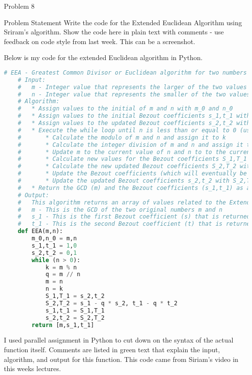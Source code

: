 \begin{problem}{Problem 8}
    \begin{statement}{Problem Statement}
        Write the code for the Extended Euclidean Algorithm using Sriram’s algorithm. Show the code here in plain text with comments - use feedback on code style from last week. This can be a screenshot.
    \end{statement}

    \begin{Highlight}[Solution]
        Below is my code for the extended Euclidean algorithm in Python.
    \begin{lstlisting}[style=stackoverflow, language=python]
    # EEA - Greatest Common Divisor or Euclidean algorithm for two numbers m and n
    # Input:
    #   m - Integer value that represents the larger of the two values in the EEA calculation
    #   n - Integer value that represents the smaller of the two values in the EEA calculation
    # Algorithm:
    #   * Assign values to the initial of m and n with m_0 and n_0
    #   * Assign values to the initial Bezout coefficients s_1,t_1 with 1 and 0
    #   * Assign values to the updated Bezout coefficients s_2,t_2 with 0 and 1
    #   * Execute the while loop until n is less than or equal to 0 (usually equal to 0)
    #       * Calculate the modulo of m and n and assign it to k
    #       * Calculate the integer division of m and n and assign it to q
    #       * Update m to the current value of n and n to to the current value of k
    #       * Calculate new values for the Bezout coefficients S_1,T_1 with s_2,t_2
    #       * Calculate the new updated Bezout coefficients S_2,T_2 with s_1 - q * s_2, t_1 - q * t_2
    #       * Update the Bezout coefficients (which will eventually be returned) s_1,t_1 with S_1,T_1
    #       * Update the updated Bezout coefficients s_2,t_2 with S_2,T_2
    #   * Return the GCD (m) and the Bezout coefficients (s_1,t_1) as an array after the loop
    # Output:
    #   This algorithm returns an array of values related to the Extended Euclidean Algorithm
    #   m - This is the GCD of the two original numbers m and n
    #   s_1 - This is the first Bezout coefficient (s) that is returned
    #   t_1 - This is the second Bezout coefficient (t) that is returned
    def EEA(m,n):
        m_0,n_0 = m,n
        s_1,t_1 = 1,0
        s_2,t_2 = 0,1
        while (n > 0):
            k = m % n
            q = m // n
            m = n
            n = k
            S_1,T_1 = s_2,t_2
            S_2,T_2 = s_1 - q * s_2, t_1 - q * t_2
            s_1,t_1 = S_1,T_1
            s_2,t_2 = S_2,T_2
        return [m,s_1,t_1]
    \end{lstlisting}
    I used parallel assignment in Python to cut down on the syntax of the actual function itself. Comments are listed in green text that explain the input, algorithm, and output for this function.
    This code came from Siriam's video in this weeks lectures.
    \end{Highlight}
\end{problem}

